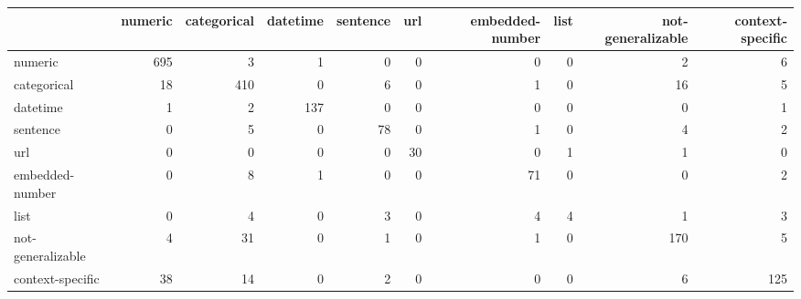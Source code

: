 \begin{tabular}{lrrrrrrrrr}
\toprule
{} &  numeric &  categorical &  datetime &  sentence &  url &  embedded-number &  list &  not-generalizable &  context-specific \\
\midrule
numeric           &      695 &            3 &         1 &         0 &    0 &                0 &     0 &                  2 &                 6 \\
categorical       &       18 &          410 &         0 &         6 &    0 &                1 &     0 &                 16 &                 5 \\
datetime          &        1 &            2 &       137 &         0 &    0 &                0 &     0 &                  0 &                 1 \\
sentence          &        0 &            5 &         0 &        78 &    0 &                1 &     0 &                  4 &                 2 \\
url               &        0 &            0 &         0 &         0 &   30 &                0 &     1 &                  1 &                 0 \\
embedded-number   &        0 &            8 &         1 &         0 &    0 &               71 &     0 &                  0 &                 2 \\
list              &        0 &            4 &         0 &         3 &    0 &                4 &     4 &                  1 &                 3 \\
not-generalizable &        4 &           31 &         0 &         1 &    0 &                1 &     0 &                170 &                 5 \\
context-specific  &       38 &           14 &         0 &         2 &    0 &                0 &     0 &                  6 &               125 \\
\bottomrule
\end{tabular}
